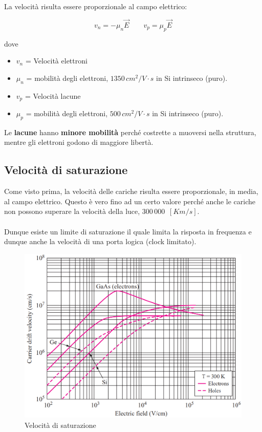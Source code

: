 \newpage
La velocità risulta essere proporzionale al campo elettrico:

\begin{equation}
    v_n = -\mu_n\vec{E} \quad\quad v_p = \mu_p\vec{E}
\end{equation}

dove 
\begin{itemize}
    \item $v_n$ = Velocità elettroni
    \item $\mu_n$ = mobilità	degli	elettroni,	$1350\, cm^2/V\cdot s$	in	Si	intrinseco (puro).
    \item $v_p$ = Velocità lacune
    \item $\mu_p$ = mobilità	degli	elettroni,	$500\, cm^2/V \cdot s$	in	Si	intrinseco (puro).
\end{itemize}

Le	\textbf{lacune}	hanno	\textbf{minore	mobilità}	perché	costrette	a	muoversi	
nella	struttura,	mentre	gli	elettroni	godono di maggiore libertà.

\subsection{Velocità	di	saturazione}
Come visto prima, la velocità delle cariche risulta essere proporzionale, in media, al campo elettrico. Questo è vero fino ad un certo valore perché anche le cariche non possono superare la velocità	della luce, $300\,000\,\,\,[Km/s]$.

\paragraph{}
Dunque esiste un limite di saturazione il quale limita la risposta in frequenza e dunque anche la velocità di una porta logica (clock limitato).

\begin{figure}[htbp]
    \centering
    \includegraphics[width=0.75\linewidth]{img/saturazione.png}
    \caption{Velocità	di	saturazione}
\end{figure}

